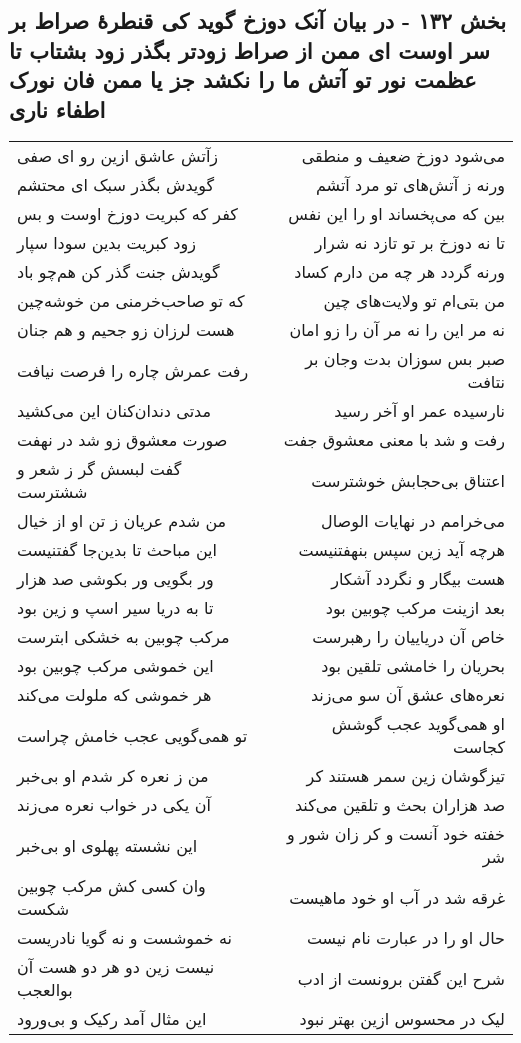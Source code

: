 \begin{center}
\section*{بخش ۱۳۲ - در بیان آنک دوزخ گوید کی قنطرهٔ صراط بر سر اوست ای ممن از صراط زودتر بگذر زود بشتاب تا عظمت نور تو آتش ما را نکشد جز یا ممن فان نورک اطفاء ناری}
\label{sec:sh132}
\begin{longtable}{l p{0.5cm} r}
زآتش عاشق ازین رو ای صفی
&&
می‌شود دوزخ ضعیف و منطقی
\\
گویدش بگذر سبک ای محتشم
&&
ورنه ز آتش‌های تو مرد آتشم
\\
کفر که کبریت دوزخ اوست و بس
&&
بین که می‌پخساند او را این نفس
\\
زود کبریت بدین سودا سپار
&&
تا نه دوزخ بر تو تازد نه شرار
\\
گویدش جنت گذر کن هم‌چو باد
&&
ورنه گردد هر چه من دارم کساد
\\
که تو صاحب‌خرمنی من خوشه‌چین
&&
من بتی‌ام تو ولایت‌های چین
\\
هست لرزان زو جحیم و هم جنان
&&
نه مر این را نه مر آن را زو امان
\\
رفت عمرش چاره را فرصت نیافت
&&
صبر بس سوزان بدت وجان بر نتافت
\\
مدتی دندان‌کنان این می‌کشید
&&
نارسیده عمر او آخر رسید
\\
صورت معشوق زو شد در نهفت
&&
رفت و شد با معنی معشوق جفت
\\
گفت لبسش گر ز شعر و ششترست
&&
اعتناق بی‌حجابش خوشترست
\\
من شدم عریان ز تن او از خیال
&&
می‌خرامم در نهایات الوصال
\\
این مباحث تا بدین‌جا گفتنیست
&&
هرچه آید زین سپس بنهفتنیست
\\
ور بگویی ور بکوشی صد هزار
&&
هست بیگار و نگردد آشکار
\\
تا به دریا سیر اسپ و زین بود
&&
بعد ازینت مرکب چوبین بود
\\
مرکب چوبین به خشکی ابترست
&&
خاص آن دریاییان را رهبرست
\\
این خموشی مرکب چوبین بود
&&
بحریان را خامشی تلقین بود
\\
هر خموشی که ملولت می‌کند
&&
نعره‌های عشق آن سو می‌زند
\\
تو همی‌گویی عجب خامش چراست
&&
او همی‌گوید عجب گوشش کجاست
\\
من ز نعره کر شدم او بی‌خبر
&&
تیزگوشان زین سمر هستند کر
\\
آن یکی در خواب نعره می‌زند
&&
صد هزاران بحث و تلقین می‌کند
\\
این نشسته پهلوی او بی‌خبر
&&
خفته خود آنست و کر زان شور و شر
\\
وان کسی کش مرکب چوبین شکست
&&
غرقه شد در آب او خود ماهیست
\\
نه خموشست و نه گویا نادریست
&&
حال او را در عبارت نام نیست
\\
نیست زین دو هر دو هست آن بوالعجب
&&
شرح این گفتن برونست از ادب
\\
این مثال آمد رکیک و بی‌ورود
&&
لیک در محسوس ازین بهتر نبود
\\
\end{longtable}
\end{center}
